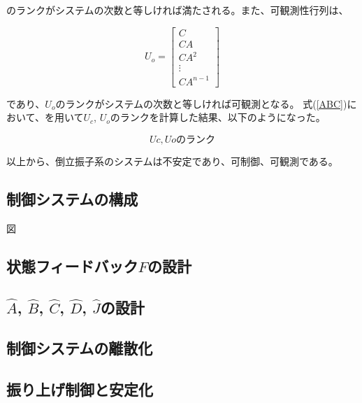 のランクがシステムの次数と等しければ満たされる。また、可観測性行列は、

$$
    U_{o} = 
    \left[
        \begin{array}{c}
            C \\
            CA \\
            CA^2 \\
            \vdots \\
            CA^{n-1}
        \end{array}
    \right]
$$

であり、$U_{o}$のランクがシステムの次数と等しければ可観測となる。
式(\ref{ABC})において、\MaTX{}を用いて$U_{c}$, $U_{o}$のランクを計算した結果、以下のようになった。

$$
    Uc, Uoのランク
$$

以上から、倒立振子系のシステムは不安定であり、可制御、可観測である。

\subsection{制御システムの構成}
図



\subsection{状態フィードバック$F$の設計}

\subsection{$\hat{A}$, $\hat{B}$, $\hat{C}$, $\hat{D}$, $\hat{J}$の設計}

\subsection{制御システムの離散化}

\subsection{振り上げ制御と安定化}



